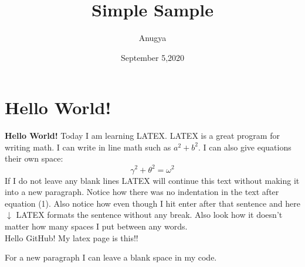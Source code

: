 \documentclass[10 pt]{article}
\begin{document}
\title{Simple Sample}
\author{Anugya}
\date{September 5,2020}
\maketitle
\section{Hello World!}
\textbf{Hello World!}
Today I am learning {\Large L}A{\Large T}E{\Large X}. LATEX is a great program for writing math. I can write in line math such as $a^2+b^2$. I can also give equations their own space:
\begin{equation}
\gamma^2+\theta^2=\omega^2
\end{equation}
If I do not leave any blank lines LATEX will continue this text without making it into a new paragraph. Notice how there was no indentation in the text after equation (1). Also notice how even though I hit enter after that sentence and here $\downarrow$ LATEX formats the sentence without any break. Also look how it doesn't
matter how many spaces I put between any words. \\ 
Hello GitHub! My latex page is this!!

For a new paragraph I can leave a blank space in my code.
\end{document}
